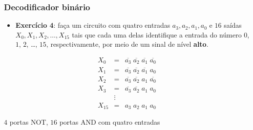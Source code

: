 \documentclass{beamer}
\newcommand{\Not}[1]{\overline{#1}}
\begin{document}
\begin{frame}[fragile]
\frametitle{Decodificador binário}

\begin{itemize}
\item \textbf{Exercício 4}: faça um circuito com quatro entradas $a_3, a_2, a_1,
a_0$ e $16$ saídas $X_0, X_1, X_2, \ldots, X_{15}$ tais que cada uma delas
identifique a entrada do número $0$, $1$, $2$, \ldots, $15$, respectivamente,
por meio de um sinal de nível \textbf{alto}.
\end{itemize}

\pause

\begin{eqnarray*}
X_0    & = & \Not{a_3} \; \Not{a_2} \; \Not{a_1} \; \Not{a_0} \\
X_1    & = & \Not{a_3} \; \Not{a_2} \; \Not{a_1} \; a_0 \\
X_2    & = & \Not{a_3} \; \Not{a_2} \; a_1 \; \Not{a_0} \\
X_3    & = & \Not{a_3} \; \Not{a_2} \; a_1 \; a_0 \\
        & \vdots & \\
X_{15} & = & a_3 \; a_2 \; a_1 \; a_0
\end{eqnarray*}

\pause

$4$ portas NOT, $16$ portas AND com quatro entradas

\end{frame}
\end{document}
